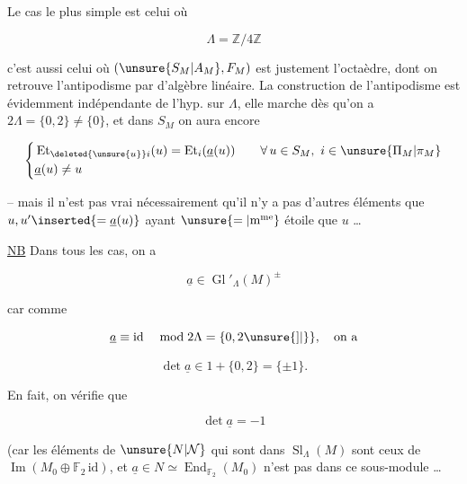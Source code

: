 

Le  cas le plus simple est celui où

\[
\Lambda=\mathbb Z/4\mathbb Z
\]

c'est aussi celui où $(\unsure{S_M|A_M},F_M)$ est justement l'octaèdre, dont on retrouve l'antipodisme par  d'algèbre linéaire. La construction  de l'antipodisme est évidemment indépendante de l'hyp.  sur $\Lambda$, elle marche dès qu'on a $2\Lambda=\{0,2\}\ne\{0\}$, et dans $S_M$ on aura encore

\[
\left\{\begin{aligned}
&\operatorname{Et}_{\deleted{\unsure{u}}i}(u)=\operatorname{Et}_i(\underline a(u))\qquad\forall\,u\in S_M,\ i\in\unsure{\Pi_M|\pi_M}\\
&\underline a(u)\ne u
\end{aligned}\right.
\]

-- mais il n'est pas vrai nécessairement qu'il n'y a pas d'autres éléments que $u,u'\inserted{=\underline a(u)}$ ayant $\unsure{=|\text{m\textsuperscript{me}}}$ étoile que $u$ \ldots\ 

\uline{NB} Dans tous les cas, on a

\[
\underline a\in\operatorname{Gl}'_\Lambda(M)^{\pm}
\]

car comme

\[
\underline a\equiv\mathrm{id}\quad\bmod 2\Lambda=\{0,2\unsure{]|\}},\quad\text{on a}
\]

\[
\det\underline a\in1+\{0,2\}=\{\pm1\}.
\]

En fait, on vérifie que

\[
\det\underline a=-1
\]

(car les éléments de $\unsure{N|\mathcal N}$ qui sont dans $\operatorname{Sl}_\Lambda(M)$ sont ceux de $\operatorname{Im}(M_0\oplus\mathbb F_2\,\mathrm{id})$, et $\underline a\in N\simeq\operatorname{End}_{\mathbb F_2}(M_0)$ n'est pas dans ce sous-module \ldots
